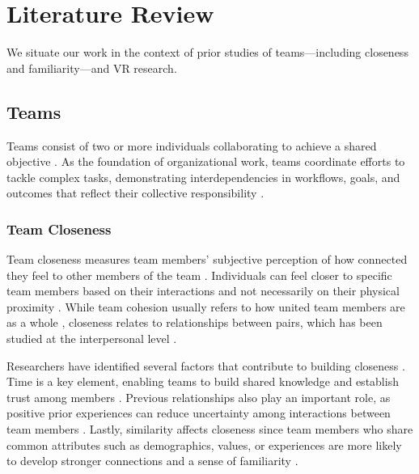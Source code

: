 \section{Literature Review}
\label{literature_review}
We situate our work in the context of prior studies of teams---including closeness and familiarity---and VR research.

\subsection{Teams}
Teams consist of two or more individuals collaborating to achieve a shared objective \cite{salas2000teamwork}. As the foundation of organizational work, teams coordinate efforts to tackle complex tasks, demonstrating interdependencies in workflows, goals, and outcomes that reflect their collective responsibility \cite{kozlowski2006enhancing, gomez2020taxonomy, baron2003group}.

\subsubsection{Team Closeness}
Team closeness measures team members' subjective perception of how connected they feel to other members of the team \cite{Gachter2015}. Individuals can feel closer to specific team members based on their interactions and not necessarily on their physical proximity \cite{Wiese2011}. While team cohesion usually refers to how united team members are as a whole \cite{salas2015measuring}, closeness relates to relationships between pairs, which has been studied at the interpersonal level \cite{rosh2012too}. 

Researchers have identified several factors that contribute to building closeness \cite{moreland1982exposure}. Time is a key element, enabling teams to build shared knowledge and establish trust among members \cite{harrison2003time, gillespie2012factors, cattani2013tackling}. Previous relationships also play an important role, as positive prior experiences can reduce uncertainty among interactions between team members \cite{de2017attuning, jones2019essentials, dittmer2020cut}. Lastly, similarity affects closeness since team members who share common attributes such as demographics, values, or experiences are more likely to develop stronger connections and a sense of familiarity \cite{hinds2000choosing, ruef2003structure, winship2011homophily}.

